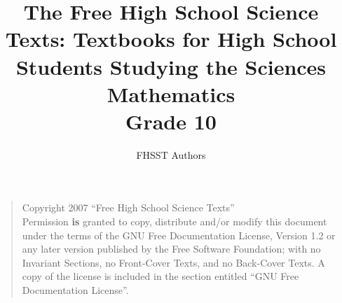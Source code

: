 \documentclass[10pt,a4paper,titlepage,twoside,openright]{report}
\begin{document}
\title{The Free High School Science Texts: Textbooks for High School Students Studying the Sciences\\
\textbf{Mathematics}\\
Grade 10}
\author{FHSST Authors}
\maketitle
\cleardoublepage
\begin{quote}
Copyright 2007 ``Free High School Science Texts''\\
Permission \textbf{is} granted to copy, distribute and/or modify this document under the terms of the GNU Free Documentation License, Version 1.2 or any later version published by the Free Software Foundation; with no Invariant Sections, no Front-Cover Texts, and no Back-Cover Texts.
A copy of the license is included in the section entitled ``GNU Free Documentation License''.
\end{quote}
\end{document}

